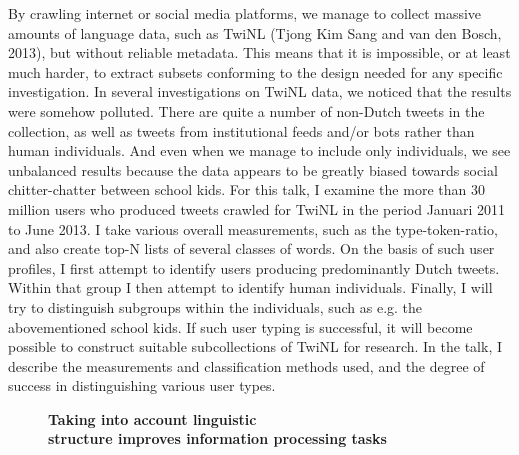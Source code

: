 \documentclass[10pt, a4paper, twopage, headinclude, footinclude, BCOR5mm]{scrartcl}
\begin{document}
\noindent
By crawling internet or social media platforms, we manage to collect massive amounts of language data, such as TwiNL (Tjong Kim Sang and van den Bosch, 2013), but without reliable metadata. This means that it is impossible, or at least much harder, to extract subsets conforming to the design needed for any specific investigation. In several investigations on TwiNL data, we noticed that the results were somehow polluted. There are quite a number of non-Dutch tweets in the collection, as well as tweets from institutional feeds and/or bots rather than human individuals. And even when we manage to include only individuals, we see unbalanced results because the data appears to be greatly biased towards social chitter-chatter between school kids.  For this talk, I examine the more than 30 million users who produced tweets crawled for TwiNL in the period Januari 2011 to June 2013. I take various overall measurements, such as the type-token-ratio, and also create top-N lists of several classes of words. On the basis of such user profiles, I first attempt to identify users producing predominantly Dutch tweets. Within that group I then attempt to identify human individuals. Finally, I will try to distinguish subgroups within the individuals, such as e.g. the abovementioned school kids. If such user typing is successful, it will become possible to construct suitable subcollections of TwiNL for research.   In the talk, I describe the measurements and classification methods used, and the degree of success in distinguishing various user types. 


\newpage

\begin{figure}[t!]
\centering
\large\textbf{Taking into account linguistic \\ structure improves information processing tasks}
\vspace*{0.5cm}
\end{figure}


        \begin{table}[t!]
    \end{table}
\end{document}

